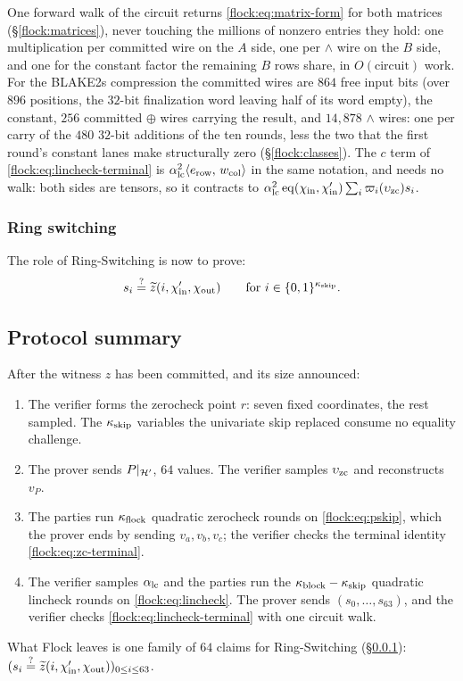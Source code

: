 One forward walk of the circuit returns \eqref{flock:eq:matrix-form} for both matrices (\S\ref{flock:matrices}), never touching the millions of nonzero entries they hold: one multiplication per committed wire on the $A$ side, one per $\wedge$ wire on the $B$ side, and one for the constant factor the remaining $B$ rows share, in $O(\text{circuit})$ work. For the BLAKE2s compression the committed wires are $864$ free input bits (over $896$ positions, the $32$-bit finalization word leaving half of its word empty), the constant, $256$ committed $\oplus$ wires carrying the result, and $14{,}878$ $\wedge$ wires: one per carry of the $480$ $32$-bit additions of the ten rounds, less the two that the first round's constant lanes make structurally zero (\S\ref{flock:classes}). The $c$ term of \eqref{flock:eq:lincheck-terminal} is $\alpha_{\mathrm{lc}}^2\langle e_{\mathrm{row}},\, w_{\mathrm{col}} \rangle$ in the same notation, and needs no walk: both sides are tensors, so it contracts to $\alpha_{\mathrm{lc}}^2\operatorname{eq}(\chi_{\mathrm{in}},\chi'_{\mathrm{in}})\sum_i\varpi_i(\upsilon_{\mathrm{zc}})s_i$.

\subsubsection{Ring switching}\label{flock:ringswitch}

The role of Ring-Switching is now to prove:
\[
s_i \stackrel{?}{=} \widetilde{z}(i,\chi'_{\mathrm{in}},\chi_{\mathrm{out}})\qquad\text{for }i\in\{0,1\}^{\kappa_{\mathrm{skip}}}.
\]


\subsection{Protocol summary}\label{flock:summary}

\begin{protocol}\label{flock:protocol}
After the witness $z$ has been committed, and its size announced:
\begin{enumerate}
\item The verifier forms the zerocheck point $r$: seven fixed coordinates, the rest sampled. The $\kappa_{\mathrm{skip}}$ variables the univariate skip replaced consume no equality challenge.
\item The prover sends $P|_{\mathcal{H}'}$, $64$ values. The verifier samples $\upsilon_{\mathrm{zc}}$ and reconstructs $v_P$.
\item The parties run $\kappa_{\mathrm{flock}}$ quadratic zerocheck rounds on \eqref{flock:eq:pskip}, which the prover ends by sending $v_a,v_b,v_c$; the verifier checks the terminal identity \eqref{flock:eq:zc-terminal}.
\item The verifier samples $\alpha_{\mathrm{lc}}$ and the parties run the $\kappa_{\mathrm{block}}-\kappa_{\mathrm{skip}}$ quadratic lincheck rounds on \eqref{flock:eq:lincheck}. The prover sends $(s_0,\ldots,s_{63})$, and the verifier checks \eqref{flock:eq:lincheck-terminal} with one circuit walk.
\end{enumerate}
What Flock leaves is one family of $64$ claims for Ring-Switching (\S\ref{flock:ringswitch}): $(s_i \stackrel{?}{=} \widetilde{z}(i, \chi'_{\mathrm{in}},\chi_{\mathrm{out}}))_{0 \leq i \leq 63}$.
\end{protocol}

